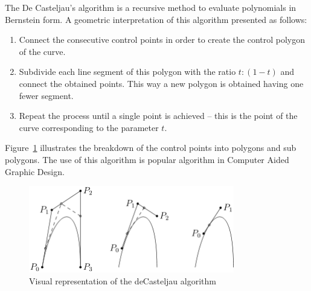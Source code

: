 \par The De Casteljau's algorithm is a recursive method to evaluate polynomials in Bernstein form. A geometric interpretation of this algorithm presented as follows: 
\begin{enumerate}
    \item Connect the consecutive control points in order to create the control polygon of the curve.
	\item Subdivide each line segment of this polygon with the ratio $t:(1-t)$ and connect the obtained points. This way a new polygon is obtained having one fewer segment.
    \item Repeat the process until a single point is achieved – this is the point of the curve corresponding to the parameter $t$.
\end{enumerate}
    
Figure~\ref{fig:deCasteljau} illustrates the breakdown of the control points into polygons and sub polygons. The use of this algorithm is popular algorithm in Computer Aided Graphic Design.

\begin{figure}[h!]
\centering
\includegraphics[width=0.8\textwidth]{Images/deCasteljau.png}
\caption{Visual representation of the deCasteljau algorithm}
\label{fig:deCasteljau}
\end{figure}




